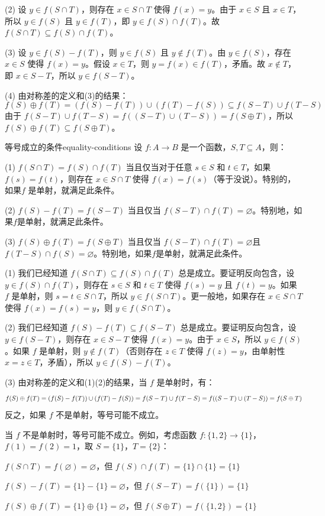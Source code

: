 (2) 设 $y \in f(S \cap T)$，则存在 $x \in S \cap T$ 使得 $f(x) = y$。由于 $x \in S$ 且 $x \in T$，所以 $y \in f(S)$ 且 $y \in f(T)$，即 $y \in f(S) \cap f(T)$。故 $f(S \cap T) \subseteq f(S) \cap f(T)$。

(3) 设 $y \in f(S) - f(T)$，则 $y \in f(S)$ 且 $y \notin f(T)$。由 $y \in f(S)$，存在 $x \in S$ 使得 $f(x) = y$。假设 $x \in T$，则 $y = f(x) \in f(T)$，矛盾。故 $x \notin T$，即 $x \in S - T$，所以 $y \in f(S - T)$。

(4) 由对称差的定义和(3)的结果：
\[
f(S) \oplus f(T) = (f(S) - f(T)) \cup (f(T) - f(S)) \subseteq f(S - T) \cup f(T - S)
\]
由于 $f(S - T) \cup f(T - S) = f((S - T) \cup (T - S)) = f(S \oplus T)$，所以 $f(S) \oplus f(T) \subseteq f(S \oplus T)$。
\begin{theorem}{等号成立的条件}{equality-conditions}
设 $f: A \to B$ 是一个函数，$S, T \subseteq A$，则：

(1) $f(S \cap T) = f(S) \cap f(T)$ 当且仅当对于任意 $s \in S$ 和 $t \in T$，如果 $f(s) = f(t)$，则存在 $x \in S \cap T$ 使得 $f(x) = f(s)$（等于没说）。特别的，如果$f$ 是单射，就满足此条件。

(2) $f(S) - f(T) = f(S - T)$ 当且仅当 $f(S-T)\cap f(T)=\varnothing$。特别地，如果$f$是单射，就满足此条件。

(3) $f(S) \oplus f(T) = f(S \oplus T)$ 当且仅当 $f(S-T)\cap f(T)=\varnothing$且$f(T-S)\cap f(S)=\varnothing$。特别地，如果$f$是单射，就满足此条件。
\end{theorem}
(1) 我们已经知道 $f(S \cap T) \subseteq f(S) \cap f(T)$ 总是成立。要证明反向包含，设 $y \in f(S) \cap f(T)$，则存在 $s \in S$ 和 $t \in T$ 使得 $f(s) = y$ 且 $f(t) = y$。如果 $f$ 是单射，则 $s = t \in S \cap T$，所以 $y \in f(S \cap T)$。更一般地，如果存在 $x \in S \cap T$ 使得 $f(x) = f(s) = y$，则 $y \in f(S \cap T)$。

(2) 我们已经知道 $f(S) - f(T) \subseteq f(S - T)$ 总是成立。要证明反向包含，设 $y \in f(S - T)$，则存在 $x \in S - T$ 使得 $f(x) = y$。由于 $x \in S$，所以 $y \in f(S)$。如果 $f$ 是单射，则 $y \notin f(T)$（否则存在 $z \in T$ 使得 $f(z) = y$，由单射性 $x = z \in T$，矛盾），所以 $y \in f(S) - f(T)$。

(3) 由对称差的定义和(1)(2)的结果，当 $f$ 是单射时，有：\vspace{-10pt}
\[
f(S) \oplus f(T) = (f(S) - f(T)) \cup (f(T) - f(S)) = f(S - T) \cup f(T - S) = f((S - T) \cup (T - S)) = f(S \oplus T)\vspace{-10pt}
\]
反之，如果 $f$ 不是单射，等号可能不成立。

\begin{remark}
当 $f$ 不是单射时，等号可能不成立。例如，考虑函数 $f: \{1,2\} \to \{1\}$，$f(1) = f(2) = 1$，取 $S = \{1\}$，$T = \{2\}$：

$f(S \cap T) = f(\varnothing) = \varnothing$，但 $f(S) \cap f(T) = \{1\} \cap \{1\} = \{1\}$

$f(S) - f(T) = \{1\} - \{1\} = \varnothing$，但 $f(S - T) = f(\{1\}) = \{1\}$

$f(S) \oplus f(T) = \{1\} \oplus \{1\} = \varnothing$，但 $f(S \oplus T) = f(\{1,2\}) = \{1\}$
\end{remark}
